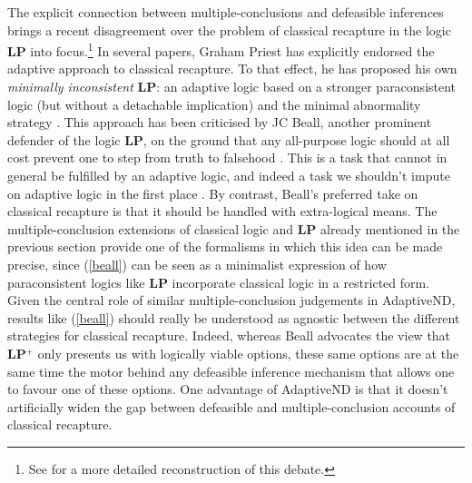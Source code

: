 \documentclass[]{article}
\begin{document}
The explicit connection between multiple-conclusions and defeasible inferences brings a recent disagreement over the problem of classical recapture in the logic \textbf{LP} into focus.\footnote{See \cite[18ff]{Allo:Theoria:2015} for a more detailed reconstruction of this debate.} In several papers, Graham Priest has explicitly endorsed the adaptive approach to classical recapture. To that effect, he has proposed his own \emph{minimally inconsistent} \textbf{LP}: an adaptive logic based on a stronger paraconsistent logic (but without a detachable implication) and the minimal abnormality strategy \cite{GP:LPm}. This approach has been criticised by JC Beall, another prominent defender of the logic \textbf{LP}, on the ground that any all-purpose logic should at all cost prevent one to step from truth to falsehood \cite{Beall01072012}. This is a task that cannot in general be fulfilled by an adaptive logic, and indeed a task we shouldn't impute on adaptive logic in the first place \cite{Priest01102012}. By contrast, Beall's preferred take on classical recapture is that it should be handled with extra-logical means. The multiple-conclusion extensions of classical logic and \textbf{LP} already mentioned in the previous section provide one of the formalisms in which this idea can be made precise, since (\ref{beall}) can be seen as a minimalist expression of how paraconsistent logics like \textbf{LP} incorporate classical logic in a restricted form. Given the central role of similar multiple-conclusion judgements in \textsf{AdaptiveND}, results like (\ref{beall}) should really be understood as agnostic between the different strategies for classical recapture. Indeed, whereas Beall advocates the view that \textbf{LP$^+$} only presents us with logically viable options, these same options are at the same time the motor behind any defeasible inference mechanism that allows one to favour one of these options. One advantage of \textsf{AdaptiveND} is that it doesn't artificially widen the gap between defeasible and multiple-conclusion accounts of classical recapture.
\end{document}
